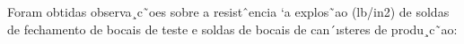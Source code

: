 \question Foram obtidas observa¸c˜oes sobre a resistˆencia `a explos˜ao (lb/in2) de soldas de fechamento
de bocais de teste e soldas de bocais de can´ısteres de produ¸c˜ao: